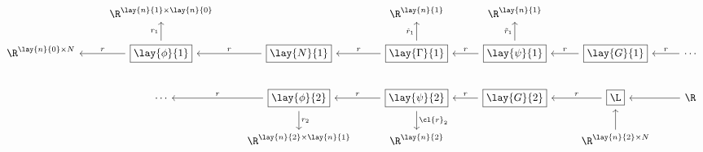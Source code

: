 {\tiny
\begin{equation*}
	\begin{tikzcd}
		{}
		&\R^{\lay{n}{1}\times\lay{n}{0}}
		&{}
		&\R^{\lay{n}{1}}
		&\R^{\lay{n}{1}}
		&{}
		\\
		\R^{\lay{n}{0}\times N}
		&\boxed{\lay{\phi}{1}}
		\arrow[l, swap, "r"]
		\arrow[u, "r_1"]
		&\boxed{\lay{N}{1}}
		\arrow[l, swap, "r"]
		&\boxed{\lay{\Gamma}{1}}
		\arrow[l, swap, "r"]
		\arrow[u, "\hat{r}_1"]
		&\boxed{\lay{\psi}{1}}
		\arrow[l, swap, "r"]
		\arrow[u, "\tilde{r}_1"]
		&\boxed{\lay{G}{1}}
		\arrow[l, swap, "r"]
		&\cdots
		\arrow[l, swap, "r"]
		\\
		{}
		&\cdots
		&\boxed{\lay{\phi}{2}}
		\arrow[l, swap, "r"]
		\arrow[d, "r_2"]
		&\boxed{\lay{\psi}{2}}
		\arrow[l, swap, "r"]
		\arrow[d, "\cl{r}_2"]
		&\boxed{\lay{G}{2}}
		\arrow[l, swap, "r"]
		&\boxed{\L}
		\arrow[l, swap, "r"]
		&\R
		\arrow[l]
		\\
		{}
		&{}
		&\R^{\lay{n}{2}\times\lay{n}{1}}
		&\R^{\lay{n}{2}}
		&{}
		&\R^{\lay{n}{2}\times N}
		\arrow[u]
		&{}
	\end{tikzcd}
\end{equation*}
}


